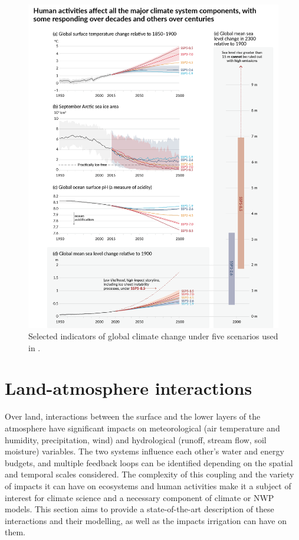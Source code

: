 \begin{figure}[hbtp]
    \centering
    \includegraphics[width=\textwidth]{images/intro/IPCC_AR6_WGI_SPM_Figure_8.png}
    \caption{Selected indicators of global climate change under five scenarios used in \citet{IPCC_2023}.}
    \label{fig:ipcc_ssp}
\end{figure}

\clearpage
\section{Land-atmosphere interactions}
\label{sec:l-a_interactions}

Over land, interactions between the surface and the lower layers of the atmosphere have significant impacts on meteorological (air temperature and humidity, precipitation, wind) and hydrological (runoff, stream flow, soil moisture) variables. The two systems influence each other's water and energy budgets, and multiple feedback loops can be identified depending on the spatial and temporal scales considered. The complexity of this coupling and the variety of impacts it can have on ecosystems and human activities make it a subject of interest for climate science and a necessary component of climate or NWP models. This section aims to provide a state-of-the-art description of these interactions and their modelling, as well as the impacts irrigation can have on them. 

